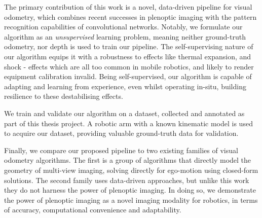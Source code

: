 \documentclass[openany]{book}
\begin{document}
The primary contribution of this work is a novel, data-driven pipeline for visual odometry, which combines recent successes in plenoptic imaging with the pattern recognition capabilities of convolutional networks. Notably, we formulate our algorithm as an \textit{unsupervised} learning problem, meaning neither ground-truth odometry, nor depth is used to train our pipeline. The self-supervising nature of our algorithm equips it with a robustness to effects like thermal expansion, and shock - effects which are all too common in mobile robotics, and likely to render equipment calibration invalid. Being self-supervised, our algorithm is capable of adapting and learning from experience, even whilst operating in-situ, building resilience to these destabilising effects.



We train and validate our algorithm on a dataset, collected and annotated as part of this thesis project. A robotic arm with a known kinematic model is used to acquire our dataset, providing valuable ground-truth data for validation.

Finally, we compare our proposed pipeline to two existing families of visual odometry algorithms. The first is a group of algorithms that directly model the geometry of multi-view imaging, solving directly for ego-motion using closed-form solutions. The second family uses data-driven approaches, but unlike this work they do not harness the power of plenoptic imaging. In doing so, we demonstrate the power of plenoptic imaging as a novel imaging modality for robotics, in terms of accuracy, computational convenience and adaptability.
\end{document}
